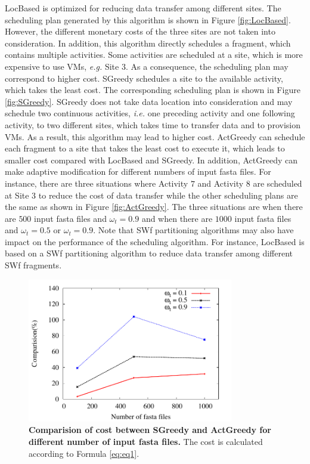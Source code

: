 LocBased is optimized for reducing data transfer among different sites. The scheduling plan generated by this algorithm is shown in Figure \ref{fig:LocBased}. However, the different monetary costs of the three sites are not taken into consideration. In addition, this algorithm directly schedules a fragment, which contains multiple activities. Some activities are scheduled at a site, which is more expensive to use VMs, \textit{e.g.} Site $3$. As a consequence, the scheduling plan may correspond to higher cost. SGreedy schedules a site to the available activity, which takes the least cost. The corresponding scheduling plan is shown in Figure \ref{fig:SGreedy}. SGreedy does not take data location into consideration and may schedule two continuous activities, \textit{i.e.} one preceding activity and one following activity, to two different sites, which takes time to transfer data and to provision VMs. As a result, this algorithm may lead to higher cost. ActGreedy can schedule each fragment to a site that takes the least cost to execute it, which leads to smaller cost compared with LocBased and SGreedy. In addition, ActGreedy can make adaptive modification for different numbers of input fasta files. For instance, there are three situations where Activity $7$ and Activity $8$ are scheduled at Site $3$ to reduce the cost of data transfer while the other scheduling plans are the same as shown in Figure \ref{fig:ActGreedy}. The three situations are when there are $500$ input fasta files and $\omega_t = 0.9$ and when there are $1000$ input fasta files and $\omega_t = 0.5$ or $\omega_t = 0.9$. Note that SWf partitioning algorithms may also have impact on the performance of the scheduling algorithm. For instance, LocBased is based on a SWf partitioning algorithm to reduce data transfer among different SWf fragments.

\begin{figure}[htbp]
\begin{centering}
\captionsetup{justification=centering}
\includegraphics[width=90mm]{figures/FIG10}
\par\end{centering}
\caption{\textbf{Comparision of cost between SGreedy and ActGreedy for different number of input fasta files.} The cost is calculated according to Formula \ref{eq:eq1}.}
\label{fig:cp}
\end{figure}

